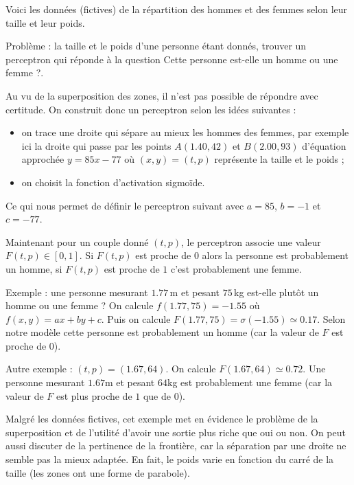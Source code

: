\documentclass[11pt,class=report,crop=false]{standalone}
\begin{document}
\begin{exemple}
Voici les données (fictives) de la répartition des hommes et des femmes selon leur taille et leur poids.
  


Problème : la taille et le poids d'une personne étant donnés, trouver un perceptron qui réponde à la question \og{}Cette personne est-elle un homme ou une femme ?\fg{}.

Au vu de la superposition des zones, il n'est pas possible de répondre avec certitude.  On construit donc un perceptron selon les idées suivantes :
\begin{itemize}
  \item on trace une droite qui sépare au mieux les hommes des femmes, par exemple ici la droite qui passe par les points $A(1.40,42)$ et $B(2.00,93)$ d'équation approchée $y=85x-77$ où $(x,y)=(t,p)$ représente la taille et le poids ;

  \item on choisit la fonction d'activation sigmoïde.
\end{itemize}
Ce qui nous permet de définir le perceptron suivant avec $a=85$, $b=-1$ et $c=-77$.

\begin{center}
\begin{minipage}{0.35\textwidth}
\end{minipage}
\begin{minipage}{0.45\textwidth}
\end{minipage}
\end{center}

Maintenant pour un couple donné $(t,p)$, le perceptron associe une valeur $F(t,p) \in [0,1]$.
Si $F(t,p)$ est proche de $0$ alors la personne est probablement un homme, si $F(t,p)$ est proche de $1$ c'est probablement une femme.


Exemple : une personne mesurant $1.77$\,m et pesant $75$\,kg est-elle plutôt un homme ou une femme ? On calcule $f(1.77,75)=-1.55$ où $f(x,y)=ax+by+c$.
Puis on calcule $F(1.77,75) = \sigma(-1.55) \simeq 0.17$. Selon notre modèle cette personne est probablement un homme (car la valeur de $F$ est proche de $0$).

Autre exemple : $(t,p)=(1.67,64)$. On calcule $F(1.67,64) \simeq 0.72$.
Une personne mesurant $1.67$m et pesant $64$kg est probablement une femme (car la valeur de $F$ est plus proche de $1$ que de $0$).

Malgré les données fictives, cet exemple met en évidence le problème de la superposition et de l'utilité d'avoir une sortie plus riche que  \og{}oui\fg{} ou \og{}non\fg{}. On peut aussi discuter de la pertinence de la frontière, car la séparation par une droite ne semble pas la mieux adaptée.  En fait, le poids varie en fonction du carré de la taille (les zones ont une forme de parabole). 
\end{exemple}
\end{document}
